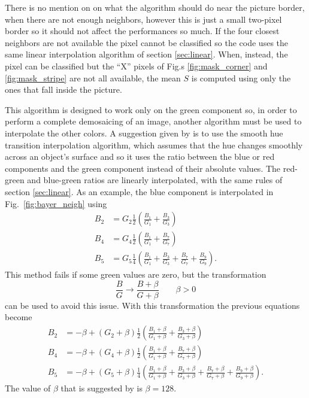 \documentclass[a4paper,oneside]{article}
\begin{document}
There is no mention on \cite{demosaic_alg, demosaic_army} on what the
algorithm should do near the picture border, when there are not enough
neighbors, however this is just a small two-pixel border so it should
not affect the performances so much.
%
If the four closest neighbors are not available the pixel cannot be
classified so the code uses the same linear interpolation algorithm of
section \ref{sec:linear}.
%
When, instead, the pixel can be classified but the ``X'' pixels of
Fig.s \ref{fig:mask_corner} and \ref{fig:mask_stripe} are not all
available, the mean $S$ is computed using only the ones that fall
inside the picture.

This algorithm is designed to work only on the green component so, in
order to perform a complete demosaicing of an image, another algorithm
must be used to interpolate the other colors. A suggestion given by
\cite{demosaic_alg, demosaic_army} is to use the smooth hue transition
interpolation algorithm, which assumes that the hue changes smoothly
across an object's surface and so it uses the ratio between the blue
or red components and the green component instead of their absolute
values.
%
The red-green and blue-green ratios are linearly interpolated, with
the same rules of section \ref{sec:linear}. As an example, the blue
component is interpolated in Fig.~\ref{fig:bayer_neigh} using
\begin{align*}
  B_2 &= G_2 \frac{1}{2} \left( \frac{B_1}{G_1} + \frac{B_3}{G_3} \right) \\
  B_4 &= G_4 \frac{1}{2} \left( \frac{B_1}{G_1} + \frac{B_7}{G_7} \right) \\
  B_5 &= G_5 \frac{1}{4} \left( \frac{B_1}{G_1} + \frac{B_3}{G_3} +
  \frac{B_7}{G_7} +\frac{B_9}{G_9}\right) .
\end{align*}
This method fails if some green values are zero, but the
transformation
\begin{equation*}
  \frac{B}{G} \rightarrow \frac{B + \beta}{ G + \beta} \qquad \beta > 0
\end{equation*}
can be used to avoid this issue.
%
With this transformation the previous equations become
\begin{align*}
  B_2 &= -\beta + \left(G_2 +\beta \right) \frac{1}{2} \left(
  \frac{B_1 + \beta}{G_1 + \beta} + \frac{B_3 + \beta}{G_3 + \beta} \right) \\
  B_4 &= -\beta + \left( G_4 + \beta \right) \frac{1}{2} \left(
  \frac{B_1 + \beta}{G_1 + \beta} + \frac{B_7 + \beta}{G_7 + \beta} \right) \\
  B_5 &= -\beta + \left( G_5 +\beta \right) \frac{1}{4} \left(
  \frac{B_1 + \beta}{G_1 + \beta} + \frac{B_3 + \beta}{G_3 + \beta} +
  \frac{B_7 + \beta}{G_7 + \beta} +\frac{B_9 + \beta}{G_9 + \beta}\right) .
\end{align*}
The value of $\beta$ that is suggested by \cite{demosaic_army} is
$\beta = 128$.
\end{document}
